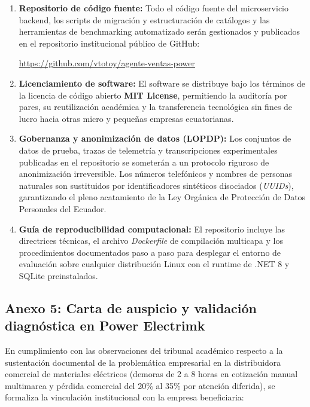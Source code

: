 \begin{enumerate}
    \item \textbf{Repositorio de código fuente:} Todo el código fuente del microservicio backend, los scripts de migración y estructuración de catálogos y las herramientas de benchmarking automatizado serán gestionados y publicados en el repositorio institucional público de GitHub:
    \begin{center}
        \url{https://github.com/vtotoy/agente-ventas-power}
    \end{center}
    \item \textbf{Licenciamiento de software:} El software se distribuye bajo los términos de la licencia de código abierto \textbf{MIT License}, permitiendo la auditoría por pares, su reutilización académica y la transferencia tecnológica sin fines de lucro hacia otras micro y pequeñas empresas ecuatorianas.
    \item \textbf{Gobernanza y anonimización de datos (LOPDP):} Los conjuntos de datos de prueba, trazas de telemetría y transcripciones experimentales publicadas en el repositorio se someterán a un protocolo riguroso de anonimización irreversible. Los números telefónicos y nombres de personas naturales son sustituidos por identificadores sintéticos disociados (\textit{UUIDs}), garantizando el pleno acatamiento de la Ley Orgánica de Protección de Datos Personales del Ecuador.
    \item \textbf{Guía de reproducibilidad computacional:} El repositorio incluye las directrices técnicas, el archivo \textit{Dockerfile} de compilación multicapa y los procedimientos documentados paso a paso para desplegar el entorno de evaluación sobre cualquier distribución Linux con el runtime de .NET 8 y SQLite preinstalados.
\end{enumerate}

\subsection{Anexo 5: Carta de auspicio y validación diagnóstica en Power Electrimk}

En cumplimiento con las observaciones del tribunal académico respecto a la sustentación documental de la problemática empresarial en la distribuidora comercial de materiales eléctricos (demoras de 2 a 8 horas en cotización manual multimarca y pérdida comercial del 20\% al 35\% por atención diferida), se formaliza la vinculación institucional con la empresa beneficiaria:

